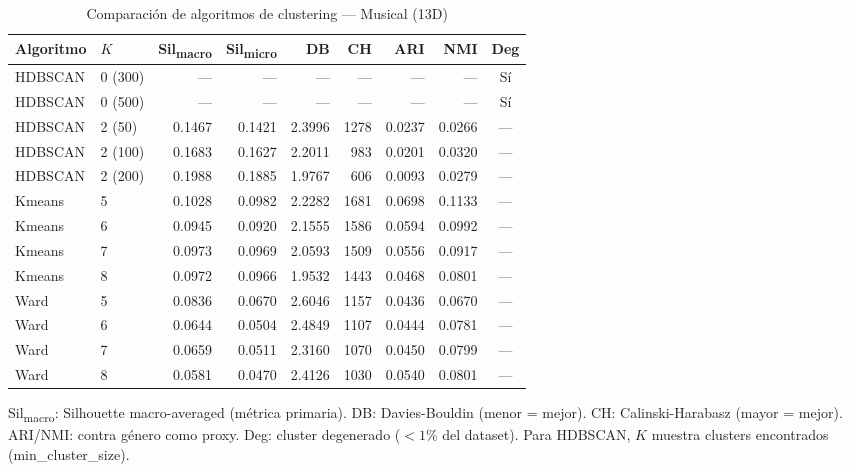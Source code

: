 \begin{table}[htbp]
  \centering
  \small
  \caption{Comparación de algoritmos de clustering --- Musical (13D)}
  \label{tab:clustering_comparison_musical_13d}
  \begin{tabular}{llrrrrrrc}
    \toprule
    Algoritmo & $K$ & Sil\textsubscript{macro} & Sil\textsubscript{micro} & DB & CH & ARI & NMI & Deg \\
    \midrule
    HDBSCAN & 0 (300) & --- & --- & --- & --- & --- & --- & Sí \\
    HDBSCAN & 0 (500) & --- & --- & --- & --- & --- & --- & Sí \\
    HDBSCAN & 2 (50) & 0.1467 & 0.1421 & 2.3996 & 1278 & 0.0237 & 0.0266 & --- \\
    HDBSCAN & 2 (100) & 0.1683 & 0.1627 & 2.2011 & 983 & 0.0201 & 0.0320 & --- \\
    HDBSCAN & 2 (200) & 0.1988 & 0.1885 & 1.9767 & 606 & 0.0093 & 0.0279 & --- \\
    Kmeans & 5 & 0.1028 & 0.0982 & 2.2282 & 1681 & 0.0698 & 0.1133 & --- \\
    Kmeans & 6 & 0.0945 & 0.0920 & 2.1555 & 1586 & 0.0594 & 0.0992 & --- \\
    Kmeans & 7 & 0.0973 & 0.0969 & 2.0593 & 1509 & 0.0556 & 0.0917 & --- \\
    Kmeans & 8 & 0.0972 & 0.0966 & 1.9532 & 1443 & 0.0468 & 0.0801 & --- \\
    Ward & 5 & 0.0836 & 0.0670 & 2.6046 & 1157 & 0.0436 & 0.0670 & --- \\
    Ward & 6 & 0.0644 & 0.0504 & 2.4849 & 1107 & 0.0444 & 0.0781 & --- \\
    Ward & 7 & 0.0659 & 0.0511 & 2.3160 & 1070 & 0.0450 & 0.0799 & --- \\
    Ward & 8 & 0.0581 & 0.0470 & 2.4126 & 1030 & 0.0540 & 0.0801 & --- \\
    \bottomrule
  \end{tabular}
  \begin{tablenotes}[flushleft]
    \small
    \item Sil\textsubscript{macro}: Silhouette macro-averaged (métrica primaria). DB: Davies-Bouldin (menor = mejor). CH: Calinski-Harabasz (mayor = mejor). ARI/NMI: contra género como proxy. Deg: cluster degenerado ($<1\%$ del dataset). Para HDBSCAN, $K$ muestra clusters encontrados (min\_cluster\_size).
  \end{tablenotes}
\end{table}